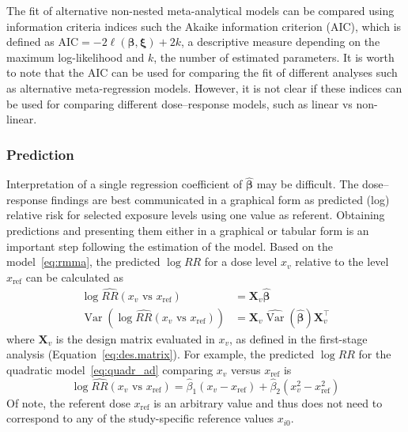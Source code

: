\documentclass[11pt,a4paper,twoside,openany]{book}\usepackage{knitr}
\DeclareMathOperator{\Var}{Var}
\begin{document}
{{The fit of alternative non-nested meta-analytical models can be compared using information criteria indices such the Akaike information criterion (AIC), which is defined as $\textrm{AIC} = -2 \ell\left(\boldsymbol{\beta}, \boldsymbol{\xi} \right) + 2k$, a descriptive measure depending on the maximum log-likelihood and $k$, the number of estimated parameters. It is  worth to note that the AIC can be used for comparing the fit of different analyses such as alternative meta-regression models. However, it is not clear if these indices can be used for comparing different dose--response models, such as linear vs non-linear. 


\subsubsection*{Prediction}\label{sec:pred}

Interpretation of a single regression coefficient of $\boldsymbol{\hat \beta}$ may be difficult. The dose--response findings are best communicated in a graphical form as predicted (log) relative risk for selected exposure levels using one value as referent. Obtaining predictions and presenting them either in a graphical or tabular form is an important step following the estimation of the model.
Based on the model~\ref{eq:rmma}, the predicted $\log RR$ for a dose level $x_v$ relative to the level $x_\mathrm{ref}$ can be calculated as
\begin{align}
\log \widehat{RR}(x_v \text{ vs } x_\mathrm{ref}) &= \mathbf{X}_v\boldsymbol{\hat \beta} \label{eq:pred} \\
\Var \left(\log \widehat{RR}(x_v \text{ vs } x_\mathrm{ref}) \right) &= \mathbf{X}_v \widehat{\Var} \left( \boldsymbol{\hat \beta} \right) \mathbf{X}_v^\top \label{eq:varpred}
\end{align}
\noindent where $\mathbf{X}_v$ is the design matrix evaluated in $x_v$, as defined in the first-stage analysis (Equation~\ref{eq:des.matrix}). For example, the predicted $\log RR$ for the quadratic model~\ref{eq:quadr_ad} comparing $x_v$ versus $x_\mathrm{ref}$ is
\begin{equation*}
\log \widehat{RR}(x_v \text{ vs } x_\mathrm{ref}) = \hat \beta_1 \left(x_v - x_\mathrm{ref} \right) + \hat \beta_2 \left(x_v^2 - x_\mathrm{ref}^2 \right)
\end{equation*}
Of note, the referent dose $x_\mathrm{ref}$ is an arbitrary value and thus does not need to correspond to any of the study-specific reference values $x_{i0}$.

}}
\end{document}
